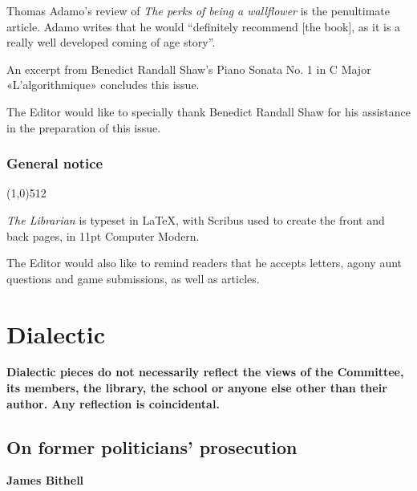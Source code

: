 \documentclass[11pt,a4paper]{report}
\let\origsection\subsection
\renewcommand{\subsection}[1]{\origsection{#1}\vspace{-0.5em}\line(1,0){512}\vspace{-1em}}
\begin{document}
\begin{multicols}{2}
		Thomas Adamo's review of \textit{The perks of being a wallflower} is the penultimate article. Adamo writes that he would ``definitely recommend [the book], as it is a really well developed coming of age story''. 
		
		An excerpt from Benedict Randall Shaw's Piano Sonata No. 1 in C Major «L'algorithmique» concludes this issue.
		
		The Editor would like to specially thank Benedict Randall Shaw for his assistance in the preparation of this issue.
		
	\end{multicols}
	
	\subsection{General notice}
	\begin{multicols}{2}
		\textit{The Librarian} is typeset in \LaTeX, with Scribus used to create the front and back pages, in 11pt Computer Modern.
		
		The Editor would also like to remind readers that he accepts letters, agony aunt questions and game submissions, as well as articles. 
		
	\end{multicols}
	
	\chapter{Dialectic}
	
	\textbf{Dialectic pieces do not necessarily reflect the views of the Committee, its members, the library, the school or anyone else other than their author. Any reflection is coincidental.}
	
	\section{On former politicians' prosecution}
	
	\textbf{James Bithell}
	
\end{document}
